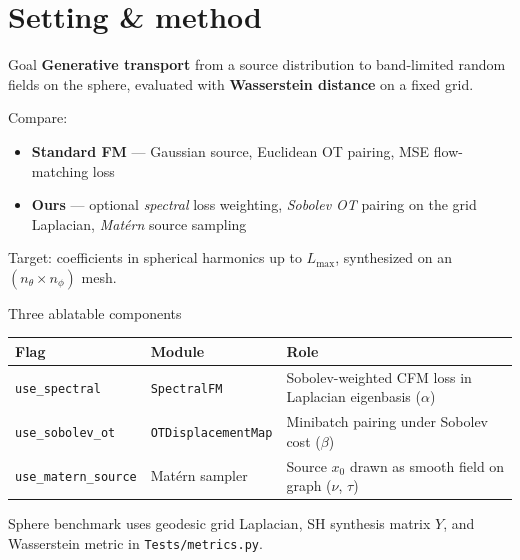 \documentclass[aspectratio=169,11pt]{beamer}
\begin{document}
\section{Setting \& method}

\begin{frame}{Goal}
  \textbf{Generative transport} from a source distribution to band-limited random fields on the sphere, evaluated with \textbf{Wasserstein distance} on a fixed grid.

  \vspace{0.6em}
  Compare:
  \begin{itemize}
    \item \textbf{Standard FM} --- Gaussian source, Euclidean OT pairing, MSE flow-matching loss
    \item \textbf{Ours} --- optional \emph{spectral} loss weighting, \emph{Sobolev OT} pairing on the grid Laplacian, \emph{Mat\'ern} source sampling
  \end{itemize}

  \vspace{0.4em}
  Target: coefficients in spherical harmonics up to $L_{\max}$, synthesized on an $(n_\theta \times n_\phi)$ mesh.
\end{frame}

\begin{frame}{Three ablatable components}
  \begin{table}
    \centering
    \small
    \begin{tabular}{@{}llp{5.2cm}@{}}
      \toprule
      \textbf{Flag} & \textbf{Module} & \textbf{Role} \\
      \midrule
      \texttt{use\_spectral} & \texttt{SpectralFM} & Sobolev-weighted CFM loss in Laplacian eigenbasis ($\alpha$) \\
      \texttt{use\_sobolev\_ot} & \texttt{OTDisplacementMap} & Minibatch pairing under Sobolev cost ($\beta$) \\
      \texttt{use\_matern\_source} & Mat\'ern sampler & Source $x_0$ drawn as smooth field on graph ($\nu$, $\tau$) \\
      \bottomrule
    \end{tabular}
  \end{table}

  \vspace{0.5em}
  Sphere benchmark uses geodesic grid Laplacian, SH synthesis matrix $Y$, and Wasserstein metric in \texttt{Tests/metrics.py}.
\end{frame}
\end{document}
